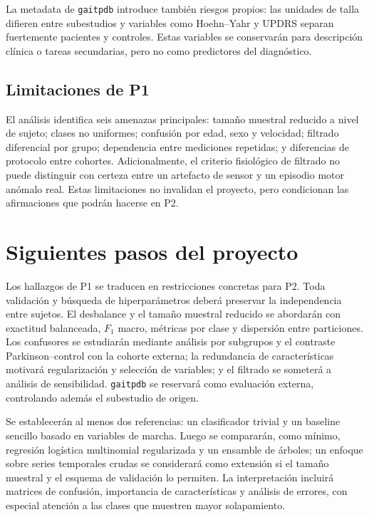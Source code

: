\documentclass[conference]{IEEEtran}
\begin{document}
La metadata de \texttt{gaitpdb} introduce también riesgos propios: las unidades de talla difieren entre subestudios y variables como Hoehn--Yahr y UPDRS separan fuertemente pacientes y controles. Estas variables se conservarán para descripción clínica o tareas secundarias, pero no como predictores del diagnóstico.

\subsection{Limitaciones de P1}
El análisis identifica seis amenazas principales: tamaño muestral reducido a nivel de sujeto; clases no uniformes; confusión por edad, sexo y velocidad; filtrado diferencial por grupo; dependencia entre mediciones repetidas; y diferencias de protocolo entre cohortes. Adicionalmente, el criterio fisiológico de filtrado no puede distinguir con certeza entre un artefacto de sensor y un episodio motor anómalo real. Estas limitaciones no invalidan el proyecto, pero condicionan las afirmaciones que podrán hacerse en P2.

\section{Siguientes pasos del proyecto}

Los hallazgos de P1 se traducen en restricciones concretas para P2. Toda validación y búsqueda de hiperparámetros deberá preservar la independencia entre sujetos. El desbalance y el tamaño muestral reducido se abordarán con exactitud balanceada, $F_1$ macro, métricas por clase y dispersión entre particiones. Los confusores se estudiarán mediante análisis por subgrupos y el contraste Parkinson--control con la cohorte externa; la redundancia de características motivará regularización y selección de variables; y el filtrado se someterá a análisis de sensibilidad. \texttt{gaitpdb} se reservará como evaluación externa, controlando además el subestudio de origen.

Se establecerán al menos dos referencias: un clasificador trivial y un baseline sencillo basado en variables de marcha. Luego se compararán, como mínimo, regresión logística multinomial regularizada y un ensamble de árboles; un enfoque sobre series temporales crudas se considerará como extensión si el tamaño muestral y el esquema de validación lo permiten. La interpretación incluirá matrices de confusión, importancia de características y análisis de errores, con especial atención a las clases que muestren mayor solapamiento.
\end{document}
